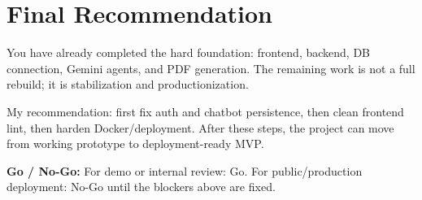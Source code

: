 \documentclass[11pt]{article}
\begin{document}
\section{Final Recommendation}

You have already completed the hard foundation: frontend, backend, DB connection, Gemini agents, and PDF generation. The remaining work is not a full rebuild; it is stabilization and productionization.

My recommendation: first fix auth and chatbot persistence, then clean frontend lint, then harden Docker/deployment. After these steps, the project can move from working prototype to deployment-ready MVP.

\textbf{Go / No-Go:} For demo or internal review: Go. For public/production deployment: No-Go until the blockers above are fixed.
\end{document}
